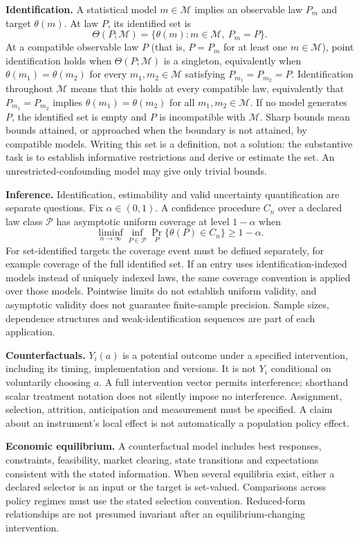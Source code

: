 \documentclass[11pt,a4paper]{article}
\begin{document}
\textbf{Identification.} A statistical model $m\in\mathcal M$ implies an observable law $P_m$ and target $\theta(m)$. At law $P$, its identified set is
\[
\Theta(P;\mathcal M)=\{\theta(m):m\in\mathcal M,\ P_m=P\}.
\]
At a compatible observable law $P$ (that is, $P=P_m$ for at least one $m\in\mathcal M$), point identification holds when $\Theta(P;\mathcal M)$ is a singleton, equivalently when $\theta(m_1)=\theta(m_2)$ for every $m_1,m_2\in\mathcal M$ satisfying $P_{m_1}=P_{m_2}=P$. Identification throughout $\mathcal M$ means that this holds at every compatible law, equivalently that $P_{m_1}=P_{m_2}$ implies $\theta(m_1)=\theta(m_2)$ for all $m_1,m_2\in\mathcal M$. If no model generates $P$, the identified set is empty and $P$ is incompatible with $\mathcal M$. Sharp bounds mean bounds attained, or approached when the boundary is not attained, by compatible models. Writing this set is a definition, not a solution: the substantive task is to establish informative restrictions and derive or estimate the set. An unrestricted-confounding model may give only trivial bounds.

\textbf{Inference.} Identification, estimability and valid uncertainty quantification are separate questions. Fix $\alpha\in(0,1)$. A confidence procedure $C_n$ over a declared law class $\mathcal P$ has asymptotic uniform coverage at level $1-\alpha$ when
\[
\liminf_{n\to\infty}\inf_{P\in\mathcal P}\Pr_P\{\theta(P)\in C_n\}\geq1-\alpha.
\]
For set-identified targets the coverage event must be defined separately, for example coverage of the full identified set. If an entry uses identification-indexed models instead of uniquely indexed laws, the same coverage convention is applied over those models. Pointwise limits do not establish uniform validity, and asymptotic validity does not guarantee finite-sample precision. Sample sizes, dependence structures and weak-identification sequences are part of each application.

\textbf{Counterfactuals.} $Y_i(a)$ is a potential outcome under a specified intervention, including its timing, implementation and versions. It is not $Y_i$ conditional on voluntarily choosing $a$. A full intervention vector permits interference; shorthand scalar treatment notation does not silently impose no interference. Assignment, selection, attrition, anticipation and measurement must be specified. A claim about an instrument's local effect is not automatically a population policy effect.

\textbf{Economic equilibrium.} A counterfactual model includes best responses, constraints, feasibility, market clearing, state transitions and expectations consistent with the stated information. When several equilibria exist, either a declared selector is an input or the target is set-valued. Comparisons across policy regimes must use the stated selection convention. Reduced-form relationships are not presumed invariant after an equilibrium-changing intervention.
\end{document}
